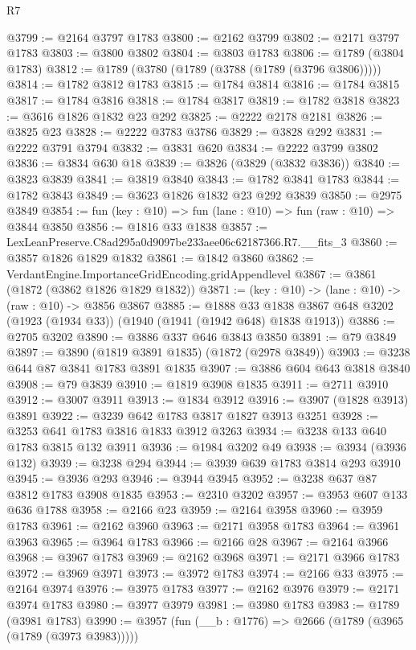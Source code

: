 \begin{lexlean}{R7}
\begin{coremodule}
@3799 := @2164 @3797 @1783
@3800 := @2162 @3799
@3802 := @2171 @3797 @1783
@3803 := @3800 @3802
@3804 := @3803 @1783
@3806 := @1789 (@3804 @1783)
@3812 := @1789 (@3780 (@1789 (@3788 (@1789 (@3796 @3806)))))
@3814 := @1782 @3812 @1783
@3815 := @1784 @3814
@3816 := @1784 @3815
@3817 := @1784 @3816
@3818 := @1784 @3817
@3819 := @1782 @3818
@3823 := @3616 @1826 @1832 @23 @292
@3825 := @2222 @2178 @2181
@3826 := @3825 @23
@3828 := @2222 @3783 @3786
@3829 := @3828 @292
@3831 := @2222 @3791 @3794
@3832 := @3831 @620
@3834 := @2222 @3799 @3802
@3836 := @3834 @630 @18
@3839 := @3826 (@3829 (@3832 @3836))
@3840 := @3823 @3839
@3841 := @3819 @3840
@3843 := @1782 @3841 @1783
@3844 := @1782 @3843
@3849 := @3623 @1826 @1832 @23 @292 @3839
@3850 := @2975 @3849
@3854 := fun (key : @10) => fun (lane : @10) => fun (raw : @10) => @3844 @3850
@3856 := @1816 @33 @1838
@3857 := LexLeanPreserve.C8ad295a0d9097be233aee06c62187366.R7.__fits_3
@3860 := @3857 @1826 @1829 @1832
@3861 := @1842 @3860
@3862 := VerdantEngine.ImportanceGridEncoding.gridAppendlevel
@3867 := @3861 (@1872 (@3862 @1826 @1829 @1832))
@3871 := (key : @10) -> (lane : @10) -> (raw : @10) -> @3856 @3867
@3885 := @1888
    @33
    @1838
    @3867
    @648
    @3202
    (@1923 (@1934 @33))
    (@1940 (@1941 (@1942 @648) @1838 @1913))
@3886 := @2705 @3202
@3890 := @3886 @337 @646 @3843 @3850
@3891 := @79 @3849
@3897 := @3890 (@1819 @3891 @1835) (@1872 (@2978 @3849))
@3903 := @3238 @644 @87 @3841 @1783 @3891 @1835
@3907 := @3886 @604 @643 @3818 @3840
@3908 := @79 @3839
@3910 := @1819 @3908 @1835
@3911 := @2711 @3910
@3912 := @3007 @3911
@3913 := @1834 @3912
@3916 := @3907 (@1828 @3913) @3891
@3922 := @3239 @642 @1783 @3817 @1827 @3913 @3251
@3928 := @3253 @641 @1783 @3816 @1833 @3912 @3263
@3934 := @3238 @133 @640 @1783 @3815 @132 @3911
@3936 := @1984 @3202 @49
@3938 := @3934 (@3936 @132)
@3939 := @3238 @294
@3944 := @3939 @639 @1783 @3814 @293 @3910
@3945 := @3936 @293
@3946 := @3944 @3945
@3952 := @3238 @637 @87 @3812 @1783 @3908 @1835
@3953 := @2310 @3202
@3957 := @3953 @607 @133 @636 @1788
@3958 := @2166 @23
@3959 := @2164 @3958
@3960 := @3959 @1783
@3961 := @2162 @3960
@3963 := @2171 @3958 @1783
@3964 := @3961 @3963
@3965 := @3964 @1783
@3966 := @2166 @28
@3967 := @2164 @3966
@3968 := @3967 @1783
@3969 := @2162 @3968
@3971 := @2171 @3966 @1783
@3972 := @3969 @3971
@3973 := @3972 @1783
@3974 := @2166 @33
@3975 := @2164 @3974
@3976 := @3975 @1783
@3977 := @2162 @3976
@3979 := @2171 @3974 @1783
@3980 := @3977 @3979
@3981 := @3980 @1783
@3983 := @1789 (@3981 @1783)
@3990 := @3957 (fun (__b : @1776) => @2666 (@1789 (@3965 (@1789 (@3973 @3983)))))

\end{coremodule}
\end{lexlean}
